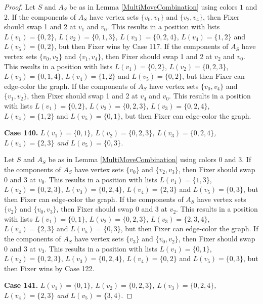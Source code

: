 \documentclass[12pt]{amsart}
\theoremstyle{plain}
\theoremstyle{definition}
\theoremstyle{remark}
\begin{document}
\begin{proof}
Let $S$ and $A_S$ be as in Lemma \ref{MultiMoveCombination} using colors $1$ and $2$. If the components of $A_S$ have vertex sets $\{v_0, v_1\}$ and $\{v_2, v_4\}$, then Fixer should swap 1 and 2 at $v_1$ and $v_0$. This results in a position with lists $L(v_1) = \{0, 2\}$, $L(v_2) = \{0, 1, 3\}$, $L(v_3) = \{0, 2, 4\}$, $L(v_4) = \{1, 2\}$ and $L(v_5) = \{0, 2\}$, but then Fixer wins by Case 117.
If the components of $A_S$ have vertex sets $\{v_0, v_2\}$ and $\{v_1, v_4\}$, then Fixer should swap 1 and 2 at $v_2$ and $v_0$. This results in a position with lists $L(v_1) = \{0, 2\}$, $L(v_2) = \{0, 2, 3\}$, $L(v_3) = \{0, 1, 4\}$, $L(v_4) = \{1, 2\}$ and $L(v_5) = \{0, 2\}$, but then Fixer can edge-color the graph.
If the components of $A_S$ have vertex sets $\{v_0, v_4\}$ and $\{v_1, v_2\}$, then Fixer should swap 1 and 2 at $v_4$ and $v_0$. This results in a position with lists $L(v_1) = \{0, 2\}$, $L(v_2) = \{0, 2, 3\}$, $L(v_3) = \{0, 2, 4\}$, $L(v_4) = \{1, 2\}$ and $L(v_5) = \{0, 1\}$, but then Fixer can edge-color the graph.

\noindent\textbf{Case 140.  }\textit{$L(v_1) = \{0, 1\}$, $L(v_2) = \{0, 2, 3\}$, $L(v_3) = \{0, 2, 4\}$, $L(v_4) = \{2, 3\}$ and $L(v_5) = \{0, 3\}$.}

Let $S$ and $A_S$ be as in Lemma \ref{MultiMoveCombination} using colors $0$ and $3$. If the components of $A_S$ have vertex sets $\{v_0\}$ and $\{v_2, v_3\}$, then Fixer should swap 0 and 3 at $v_0$. This results in a position with lists $L(v_1) = \{1, 3\}$, $L(v_2) = \{0, 2, 3\}$, $L(v_3) = \{0, 2, 4\}$, $L(v_4) = \{2, 3\}$ and $L(v_5) = \{0, 3\}$, but then Fixer can edge-color the graph.
If the components of $A_S$ have vertex sets $\{v_2\}$ and $\{v_0, v_3\}$, then Fixer should swap 0 and 3 at $v_2$. This results in a position with lists $L(v_1) = \{0, 1\}$, $L(v_2) = \{0, 2, 3\}$, $L(v_3) = \{2, 3, 4\}$, $L(v_4) = \{2, 3\}$ and $L(v_5) = \{0, 3\}$, but then Fixer can edge-color the graph.
If the components of $A_S$ have vertex sets $\{v_3\}$ and $\{v_0, v_2\}$, then Fixer should swap 0 and 3 at $v_3$. This results in a position with lists $L(v_1) = \{0, 1\}$, $L(v_2) = \{0, 2, 3\}$, $L(v_3) = \{0, 2, 4\}$, $L(v_4) = \{0, 2\}$ and $L(v_5) = \{0, 3\}$, but then Fixer wins by Case 122.

\noindent\textbf{Case 141.  }\textit{$L(v_1) = \{0, 1\}$, $L(v_2) = \{0, 2, 3\}$, $L(v_3) = \{0, 2, 4\}$, $L(v_4) = \{2, 3\}$ and $L(v_5) = \{3, 4\}$.}


\end{proof}
\end{document}
